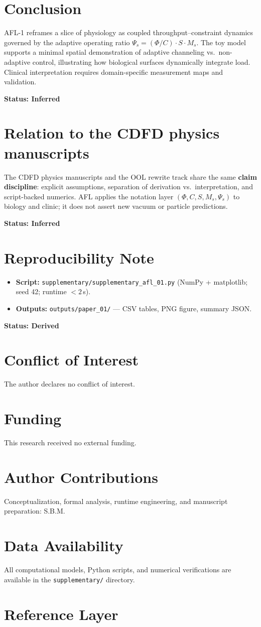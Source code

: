 \documentclass[11pt]{article}
\begin{document}
\section{Conclusion}
AFL-1 reframes a slice of physiology as coupled throughput--constraint dynamics governed by the adaptive operating ratio $\Psi_s=(\Phi/C) \cdot S \cdot M_s$. The toy model supports a minimal spatial demonstration of adaptive channeling vs.\ non-adaptive control, illustrating how biological surfaces dynamically integrate load. Clinical interpretation requires domain-specific measurement maps and validation.

\textbf{Status: Inferred}

\section{Relation to the CDFD physics manuscripts}
The CDFD physics manuscripts and the OOL rewrite track share the same \textbf{claim discipline}: explicit assumptions, separation of derivation vs.\ interpretation, and script-backed numerics. AFL applies the notation layer $(\Phi, C, S, M_s, \Psi_s)$ to biology and clinic; it does not assert new vacuum or particle predictions.

\textbf{Status: Inferred}

\section{Reproducibility Note}
\begin{itemize}
  \item \textbf{Script:} \texttt{supplementary/supplementary\_afl\_01.py} (NumPy + matplotlib; seed 42; runtime $< 2$\,s).
  \item \textbf{Outputs:} \texttt{outputs/paper\_01/} — CSV tables, PNG figure, summary JSON.
\end{itemize}
\textbf{Status: Derived}

\section*{Conflict of Interest} The author declares no conflict of interest.
\section*{Funding} This research received no external funding.
\section*{Author Contributions} Conceptualization, formal analysis, runtime engineering, and manuscript preparation: S.B.M.
\section*{Data Availability} All computational models, Python scripts, and numerical verifications are available in the \texttt{supplementary/} directory.

\section{Reference Layer}


\end{document}
